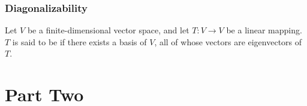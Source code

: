 \documentclass[11pt,fleqn]{book} %
\begin{document}
\section{Diagonalizability}

\setcounter{chapter}{4}
\begin{definition}[Diagonalizable]
    Let $V$ be a finite-dimensional vector space, and let $T: V \to V$ be a linear mapping. $T$ is said to be  if there exists a basis of $V$, all of whose vectors are eigenvectors of $T$.
\end{definition}
\setcounter{chapter}{3}




\part{Part Two}





\end{document}
